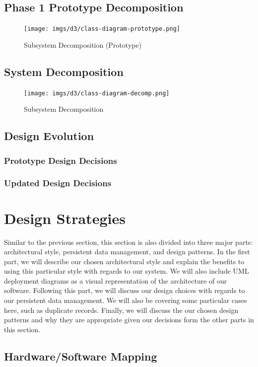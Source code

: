 \documentclass[12pt,letterpaper]{article}
\begin{document}
\subsection{Phase 1 Prototype Decomposition}
\begin{figure}[H]
	\centering{}
	\texttt{[image: imgs/d3/class-diagram-prototype.png]}
	\caption{Subsystem Decomposition (Prototype)}
\end{figure}
\subsection{System Decomposition}
\begin{figure}[H]
	\centering{}
	\texttt{[image: imgs/d3/class-diagram-decomp.png]}
	\caption{Subsystem Decomposition}
\end{figure}
\subsection{Design Evolution}
\subsubsection{Prototype Design Decisions}
\subsubsection{Updated Design Decisions}
\section{Design Strategies}

Similar to the previous section, this section is also divided into three major parts: architectural style, persistent data management, and design patterns. In the first part, we will describe our chosen architectural style and explain the benefits to using this particular style with regards to our system. We will also include UML deployment diagrams as a visual representation of the architecture of our software. Following this part, we will discuss our design choices with regards to our persistent data management. We will also be covering some particular cases here, such as duplicate records. Finally, we will discuss the our chosen design patterns and why they are appropriate given our decisions form the other parts in this section.

\subsection{Hardware/Software Mapping}
\end{document}
